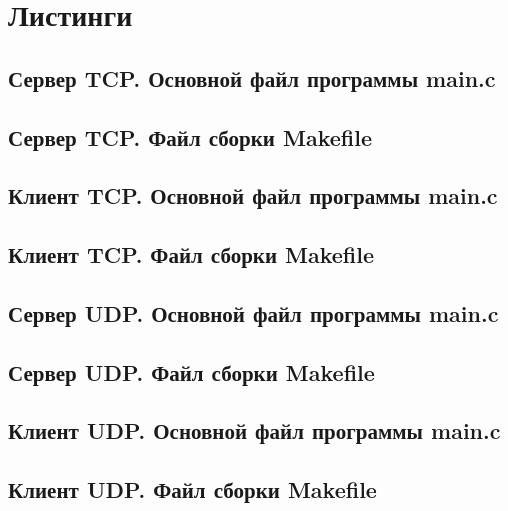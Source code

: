 \documentclass[12pt,a4paper]{report}
\begin{document}
\section{Листинги}
\subsection{Сервер TCP. Основной файл программы main.c}

\subsection{Сервер TCP. Файл сборки Makefile}

\subsection{Клиент TCP. Основной файл программы main.c}

\subsection{Клиент TCP. Файл сборки Makefile}

\subsection{Сервер UDP. Основной файл программы main.c}

\subsection{Сервер UDP. Файл сборки Makefile}

\subsection{Клиент UDP. Основной файл программы main.c}

\subsection{Клиент UDP. Файл сборки Makefile}

\end{document}
